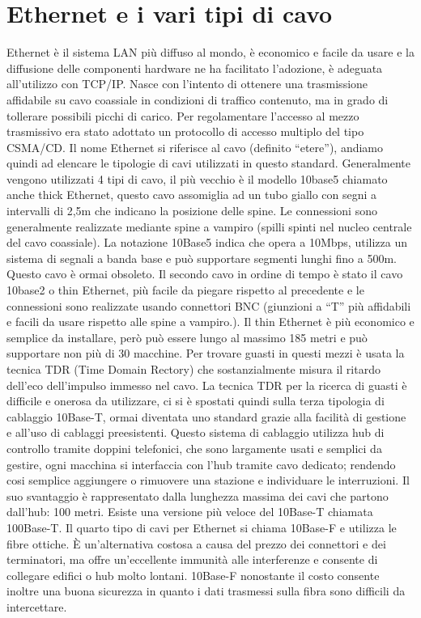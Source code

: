 \section{Ethernet e i vari tipi di cavo}

Ethernet è il sistema LAN più diffuso al mondo, è economico e facile da usare e la diffusione delle componenti hardware ne ha facilitato l’adozione, è adeguata all’utilizzo con TCP/IP.
Nasce con l’intento di ottenere una trasmissione affidabile su cavo coassiale in condizioni di traffico contenuto, ma in grado di tollerare possibili picchi di carico. Per regolamentare l’accesso al mezzo trasmissivo era stato adottato un protocollo di accesso multiplo del tipo CSMA/CD.
Il nome Ethernet si riferisce al cavo (definito “etere”), andiamo quindi ad elencare le tipologie di cavi utilizzati in questo standard.
Generalmente vengono utilizzati 4 tipi di cavo, il più vecchio è il modello 10base5 chiamato anche thick Ethernet, questo cavo assomiglia ad un tubo giallo con segni a intervalli di 2,5m che indicano la posizione delle spine.
Le connessioni sono generalmente realizzate mediante spine a vampiro (spilli spinti nel nucleo centrale del cavo coassiale). 
La notazione 10Base5 indica che opera a 10Mbps, utilizza un sistema di segnali a banda base e può supportare segmenti lunghi fino a 500m. Questo cavo è ormai obsoleto.
Il secondo cavo in ordine di tempo è stato il cavo 10base2 o thin Ethernet, più facile da piegare rispetto al precedente e le connessioni sono realizzate usando connettori BNC (giunzioni a “T” più affidabili e facili da usare rispetto alle spine a vampiro.). Il thin Ethernet è più economico e semplice da installare, però può essere lungo al massimo 185 metri e può supportare non più di 30 macchine.
Per trovare guasti in questi mezzi è usata la tecnica TDR (Time Domain Rectory) che sostanzialmente misura il ritardo dell'eco dell'impulso immesso nel cavo.
La tecnica TDR per la ricerca di guasti è difficile e onerosa da utilizzare, ci si è spostati quindi sulla terza tipologia di cablaggio 10Base-T, ormai diventata uno standard grazie alla facilità di gestione e all’uso di cablaggi preesistenti.
Questo sistema di cablaggio utilizza hub di controllo tramite doppini telefonici, che sono largamente usati e semplici da gestire, ogni macchina si interfaccia con l’hub tramite cavo dedicato; rendendo cosi semplice aggiungere o rimuovere una stazione e individuare le interruzioni. Il suo svantaggio è rappresentato dalla lunghezza massima dei cavi che partono dall’hub: 100 metri. Esiste una versione più veloce del 10Base-T chiamata 100Base-T.
Il quarto tipo di cavi per Ethernet si chiama 10Base-F e utilizza le fibre ottiche. È un’alternativa costosa a causa del prezzo dei connettori e dei terminatori, ma offre un’eccellente immunità alle interferenze e consente di collegare edifici o hub molto lontani. 10Base-F nonostante il costo consente inoltre una buona sicurezza in quanto i dati trasmessi sulla fibra sono difficili da intercettare.
 

